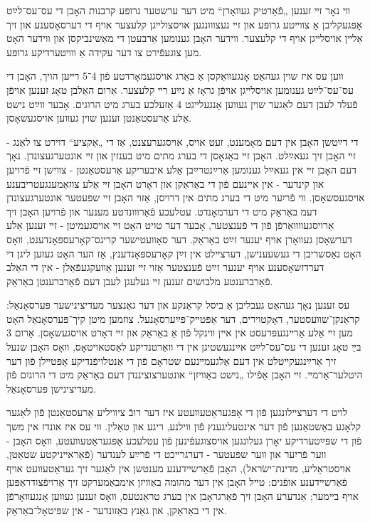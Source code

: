 \documentclass{article}
\begin{document}
\begin{pairs}
\begin{Rightside}
\begin{RTL}
\begin{hebrew}
װי נאָר זײ זענען „פֿאַרטיק געװאָרן“ מיט דער ערשטער גרופּע קרבנות
האָבן די עס־עס־לײַט אָפּגעקליבן אַ צװײטע גרופּע און זײ געצװוּנגען אויסצולײגן
קלעצער אויף די דערסאָסענע און זיך אַלײן אויסלײגן אויף די קלעצער. װידער
האָבן גענומען אַרבעטן די מאַשינביקסן און װידער האָט מען צוגעפֿירט צו
דער עקידה אַ װױטערדיקע גרופּע.

װען עס איז שוין געהאַט אָנגעװאַקסן אַ באַרג אויסגעמאָרדטע פֿון 4־5 רײען
הויך, האָבן די עס־עס־לײַט גענומען אויסלײגן אויפֿן גראָז אַ נײַע רײ קלעצער.
אַרום האַלבן טאָג זענען אויפֿן פֿעלד לעבן דעם לאַגער שוין געװען אָנגעלײגט
4 אַזעלכע בערג מיט הרוגים. אָבער װײַט נישט אַלע אַרעסטאַנטן זענען שוין
געװען אויסגעשאָסן.

די דײַטשן האָבן אין דעם מאָמענט, זעט אויס, אויסגערעצנט, אַז די „אַקציע“
דוירט צו לאַנג - זײ האָבן זיך געאײַלט. האָבן זײ באַגאָסן די בערג מתים מיט
בענזין און זײ אונטערגעצונדן. נאָך דעם האָבן זײ אין געאײַל גענומען אַרײַנטרײַבן
אַלע איבעריקע אַרעסטאַנטן - צװישן זײ פֿרויען און קינדער -  אין איינעם
 פֿון די באַראַקן און דאָרט האָבן זײ אַלע צוזאַמענגעטריבענע אויסגעסשאָסן.
װי פֿריִער מיט די בערג מתים אין דרויסן, אַזוי האָבן זײ שפּעטער
אונטערגעצונדן דעמ באַראַק מיט די דערמאָנדט. עטלעכע פֿאַרװוּנדטע מענער
און פֿרויען האָבן זיך אַרויסגעװװאַרפֿן פֿון די פֿענצטער, אָבער דער טויט האָט זײ
אויסגעמיטן - זײ זענען אַלע דערשאָסן געװאָרן אויף יענער זײַט באַראַק.
דער סאָװעטישער קריגס־קאָרעספּאָנדענט, װאָס האָט נאַסשריבן די געשעענישן,
דערצײלט אין זײַן קאָרעספּאָנדענץ, אַז הער האָט געזען ליגן די דערדזשאָסענע
אויף יענער זײַט פֿענצטער אַזוי זײ זענען אַװעקגעפֿאַלן - אין די האַלב
פֿאַרברענטע מלבושיִם זענען זײ געלעגן לעבן דעם פֿאַרברענטן באַראַק.  

עס זענען נאָך געהאַט געבליבן אַ ביסל קראַנקע און דער גאַנצער מעדיצינישער
פּערסאָנאַל: קראַנקן־שװעסטער, דאָקטוירים, דער אַפּטײק־פּײַערסאָנעל.
צוזמען מיטן קיך־פּערסאָנאַל האָט מען זײ אַלע אַרײנגעפּרעסט אין אײן װינקל
פֿון אַ באַראַק און זײ דאָרט אויסגעשאָסן. אַרום 3 בײַ טאָג זענען די עס־עס־לײַט
אײַנגעשטיגן אין די װאַרטנדיקע לאַסטאויטאָס, װאָס האָבן שנעל זיך אַרײַנגעקײטלט
אין דעם אַלגעמײנעם שטראָם פֿון די אַנטלויפֿנדיקע אָפּטײלן פֿון דער
היטלער־אַרמײ. זײ האָבן אַפֿילו „נישט באַװיזן“ אונטערצוציננדן דעם באַראַק
מיט די הרוגיִם פֿון מעדיצינישן פּערסאָנאַל.

לויט די דערצײלונגען פֿון די אָפּגעראַטעװעטע איז דער רובֿ ציװיליע אַרעסטאַנטן
פֿון לאַגער קלאָגע באַשטאַנען פֿון דער אינטעליגענץ פֿון װילנע, ריגע און
טאַלין. װי עס איז אונדז אין משך פֿון די שפּײַטערדיקע יאָרן געלונגען אויסצוגעפֿינען
פֿון עטלעכע אָפּגעראַטעװעטע, װאָס האָבן - װער פֿריִער און װער
שפּעטער - דערגרײכט די פֿרײַע לענדער (פֿאַראײניקטע שטאַטן, אויסטראַליע,
מדינת־ישׂראל), האָבן פֿאַרשײדענע מענטשן אין לאַגער זיך געראַטעװעט אויף
פֿאַרשײדענע אופֿנים:  טײל האָבן אין דער מהומה באַװיזן אימבאַמערקט זיך
אַרויפֿצודראַפּען אויף בײמער; אַנדערע האָבן זיך פֿאַרגראָבן אין בערג טראַנטעס,
װאָס זענען געװען אָנגעװאָרפֿן אין די באַראַקן, און גאַנץ באַזונדער - אין 
שפּיטאָל־באַראַק.


\end{hebrew}
\end{RTL}
\end{Rightside}
\end{pairs}
\end{document}
